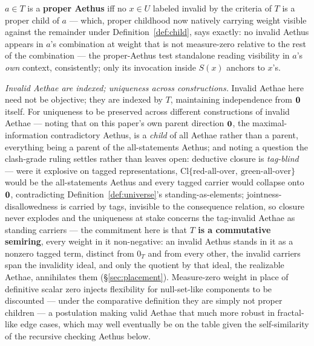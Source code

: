 \begin{defin}\label{def:proper}
$a \in T$ is a \textbf{proper Aethus} iff no $x \in U$ labeled invalid by the criteria of $T$ is a proper child of $a$ --- which, proper childhood now natively carrying weight visible against the remainder under Definition~\ref{def:child}, says exactly: no invalid Aethus appears in $a$'s combination at weight that is not measure-zero relative to the rest of the combination --- the proper-Aethus test standalone reading visibility in $a$'s \emph{own} context, consistently; only its invocation inside $S(x)$ anchors to $x$'s.

\textit{Invalid Aethae are indexed; uniqueness across constructions.} Invalid Aethae here need not be objective; they are indexed by $T$, maintaining independence from $\mathbf{0}$ itself. For uniqueness to be preserved across different constructions of invalid Aethae --- noting that on this paper's own parent direction $\mathbf{0}$, the maximal-information contradictory Aethus, is a \emph{child} of all Aethae rather than a parent, everything being a parent of the all-statements Aethus; and noting a question the clash-grade ruling settles rather than leaves open: deductive closure is \emph{tag-blind} --- were it explosive on tagged representations, $\mathrm{Cl}\{\text{red-all-over},\ \text{green-all-over}\}$ would be the all-statements Aethus and every tagged carrier would collapse onto $\mathbf{0}$, contradicting Definition~\ref{def:universe}'s standing-as-elements; jointness-disallowedness is carried by tags, invisible to the consequence relation, so closure never explodes and the uniqueness at stake concerns the tag-invalid Aethae as standing carriers --- the commitment here is that \textbf{$T$ is a commutative semiring}, every weight in it non-negative: an invalid Aethus stands in it as a nonzero tagged term, distinct from $0_T$ and from every other, the invalid carriers span the invalidity ideal, and only the quotient by that ideal, the realizable Aethae, annihilates them (§\ref{sec:placement}). Measure-zero weight in place of definitive scalar zero injects flexibility for null-set-like components to be discounted --- under the comparative definition they are simply not proper children --- a postulation making valid Aethae that much more robust in fractal-like edge cases, which may well eventually be on the table given the self-similarity of the recursive checking Aethus below.

\end{defin}
